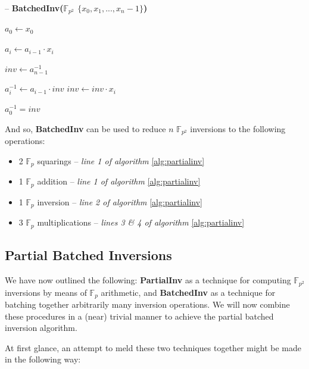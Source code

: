 \begin{algorithm}
\caption{-- \textbf{BatchedInv($\mathbb{F}_{p^{2}}$ $\{x_0, x_1, ..., x_n-1\}$)}}\label{alg:batchedinv}
\begin{algorithmic}[1]
\State $a_0 \gets x_0$

	\State $a_i \gets a_{i-1} \cdot x_i$
\EndFor

\State $inv \gets a_{n-1}^{-1}$

	\State $a_i^{-1} \gets a_{i-1} \cdot inv$
	\State $inv \gets inv \cdot x_{i}$
\EndFor

\State $a_0^{-1} = inv$

\end{algorithmic}
\end{algorithm}

And so, \textbf{BatchedInv} can be used to reduce $n$ $\mathbb{F}_{p^{2}}$ inversions to the following operations:

\begin{center}
\begin{itemize}
\item 2 $\mathbb{F}_{p}$ squarings -- \emph{line 1 of algorithm} \ref{alg:partialinv}
\item 1 $\mathbb{F}_{p}$ addition -- \emph{line 1 of algorithm} \ref{alg:partialinv}
\item 1 $\mathbb{F}_{p}$ inversion -- \emph{line 2 of algorithm} \ref{alg:partialinv}
\item 3 $\mathbb{F}_{p}$ multiplications -- \emph{lines 3 \& 4 of algorithm} \ref{alg:partialinv}
\end{itemize}
\end{center}

\subsection{Partial Batched Inversions}

We have now outlined the following: \textbf{PartialInv} as a technique for computing $\mathbb{F}_{p^2}$ inversions by means of $\mathbb{F}_{p}$ arithmetic, and \textbf{BatchedInv} as a technique for batching together arbitrarily many inversion operations. We will now combine these procedures in a (near) trivial manner to achieve the partial batched inversion algorithm.

At first glance, an attempt to meld these two techniques together might be made in the following way:

